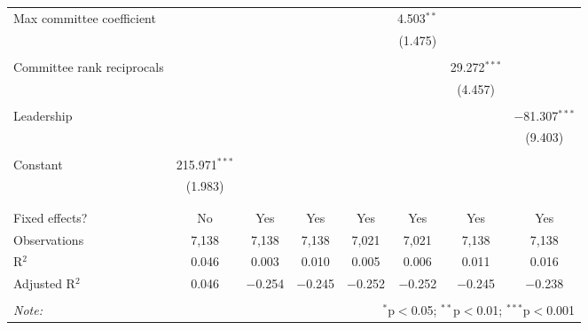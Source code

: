 \documentclass{article}
\begin{document}
\begin{table}[!htbp]
{{\begin{tabular}{@{\extracolsep{5pt}}lccccccc}
         Max committee coefficient &  &  &  &  & 4.503$^{**}$ &  &  \\ 
          &  &  &  &  & (1.475) &  &  \\ 
          & & & & & & & \\ 
         Committee rank reciprocals &  &  &  &  &  & 29.272$^{***}$ &  \\ 
          &  &  &  &  &  & (4.457) &  \\ 
          & & & & & & & \\ 
         Leadership &  &  &  &  &  &  & $-$81.307$^{***}$ \\ 
          &  &  &  &  &  &  & (9.403) \\ 
          & & & & & & & \\ 
         Constant & 215.971$^{***}$ &  &  &  &  &  &  \\ 
          & (1.983) &  &  &  &  &  &  \\ 
          & & & & & & & \\ 
        \hline \\[-1.8ex] 
        Fixed effects? & No & Yes & Yes & Yes & Yes & Yes & Yes \\ 
        Observations & 7,138 & 7,138 & 7,138 & 7,021 & 7,021 & 7,138 & 7,138 \\ 
        R$^{2}$ & 0.046 & 0.003 & 0.010 & 0.005 & 0.006 & 0.011 & 0.016 \\ 
        Adjusted R$^{2}$ & 0.046 & $-$0.254 & $-$0.245 & $-$0.252 & $-$0.252 & $-$0.245 & $-$0.238 \\ 
        \hline 
        \hline \\[-1.8ex] 
        \textit{Note:}  & \multicolumn{7}{r}{$^{*}$p$<$0.05; $^{**}$p$<$0.01; $^{***}$p$<$0.001} \\ 
        \end{tabular} 
    }}
  \end{table} 
\end{document}
